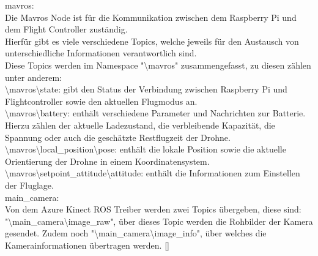 mavros: \\
Die Mavros Node ist für die Kommunikation zwischen dem Raspberry Pi und dem Flight Controller zuständig.\\
Hierfür gibt es viele verschiedene Topics, welche jeweils für den Austausch von unterschiedliche Informationen verantwortlich sind.\\
Diese Topics werden im Namespace "\textbackslash mavros" zusammengefasst, zu diesen zählen unter anderem:\\
\textbackslash mavros\textbackslash state: gibt den Status der Verbindung zwischen Raspberry Pi und Flightcontroller sowie den aktuellen Flugmodus an.\\
\textbackslash mavros\textbackslash battery: enthält verschiedene Parameter und Nachrichten zur Batterie. Hierzu zählen der aktuelle Ladezustand, die verbleibende Kapazität, die Spannung oder auch die geschätzte Restflugzeit der Drohne.\\
\textbackslash mavros\textbackslash local\_position\textbackslash pose: enthält die lokale Position sowie die aktuelle Orientierung der Drohne in einem Koordinatensystem.\\
\textbackslash mavros\textbackslash setpoint\_attitude\textbackslash attitude: enthält die Informationen zum Einstellen der Fluglage. \cite[vgl.][]{mavros}\\
 
main\_camera: \\
Von dem Azure Kinect ROS Treiber werden zwei Topics übergeben, diese sind: \\
"\textbackslash main\_camera\textbackslash image\_raw", über dieses Topic werden die Rohbilder der Kamera gesendet. Zudem noch "\textbackslash main\_camera\textbackslash image\_info", über welches die Kamerainformationen übertragen werden. []\\

